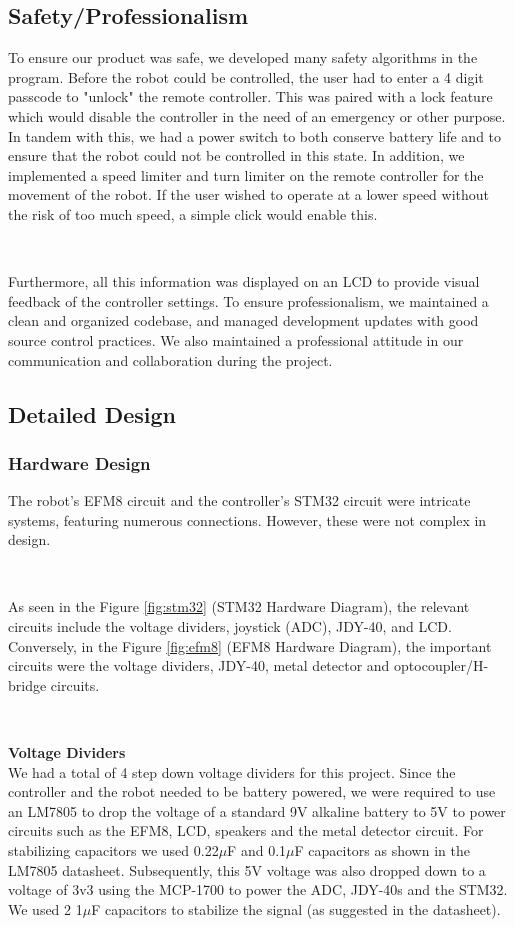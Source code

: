 \documentclass{article}
\begin{document}
\subsection{Safety/Professionalism}

To ensure our product was safe, we developed many safety algorithms in the program. Before the robot could be controlled, the user had to enter a 4 digit passcode
to "unlock" the remote controller. This was paired with a lock feature which would disable the controller in the need of an emergency or other purpose. In tandem with this,
we had a power switch to both conserve battery life and to ensure that the robot could not be controlled in this state. In addition, we implemented a speed limiter and turn
limiter on the remote controller for the movement of the robot. If the user wished to operate at a lower speed without the risk of too much speed, a simple click would enable this.

\

Furthermore, all this information was displayed on an LCD to provide visual feedback of the controller settings.
To ensure professionalism, we maintained a clean and organized codebase, and managed development updates with good source control practices. We also maintained a professional
attitude in our communication and collaboration during the project.

\subsection{Detailed Design}

\subsubsection{Hardware Design}
The robot's EFM8 circuit and the controller's STM32 circuit were intricate systems, featuring numerous connections. However, these were not complex in design.

\

As seen in the Figure \ref{fig:stm32} (STM32 Hardware Diagram), the relevant circuits include the voltage dividers, joystick (ADC), JDY-40, and LCD. Conversely, in the Figure \ref{fig:efm8} (EFM8 Hardware Diagram), the important circuits
were the voltage dividers, JDY-40, metal detector and optocoupler/H-bridge circuits.

\

\textbf{Voltage Dividers} \\
We had a total of 4 step down voltage dividers for this project. Since the controller and the robot needed to be battery powered, we were required to use an LM7805 to drop the voltage of a standard 9V alkaline battery to 5V to power circuits such as the EFM8, LCD, speakers and the metal detector circuit. For stabilizing capacitors we used 0.22$\mu$F and 0.1$\mu$F capacitors as shown in the LM7805 datasheet\cite{LM7805}. Subsequently, this 5V voltage was also dropped down to a voltage of 3v3 using the MCP-1700 to power the ADC, JDY-40s and the STM32. We used 2 1$\mu$F capacitors to stabilize the signal (as suggested in the datasheet\cite{MCP1700}).
\end{document}
